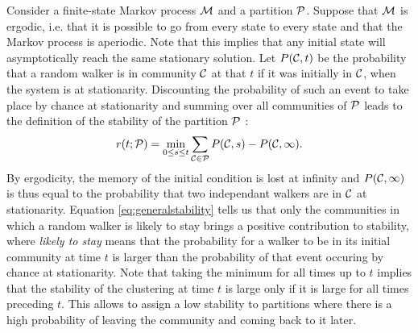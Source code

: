 Consider a finite-state Markov process $\M$ and a partition $\P$. Suppose that $\M$ is ergodic, i.e. that it is possible to go from every state to every state and that the Markov process is aperiodic. Note that this implies that any initial state will asymptotically reach the same stationary solution. Let $P(\C,t)$ be the probability that a random walker is in community $\C$ at that $t$ if it was initially in $\C$, when the system is at stationarity. Discounting the probability of such an event to take place by chance at stationarity and summing over all communities of $\P$ leads to the definition of the stability of the partition $\P$ :
\begin{equation} \label{eq:generalstability}
	r(t;\P) = \min_{0 \le s \le t} \sum_{\C \in \P} P(\C,s) - P(\C,\infty).
\end{equation}
By ergodicity, the memory of the initial condition is lost at infinity and $P(\C,\infty)$ is thus equal to the probability that two independant walkers are in $\C$ at stationarity. Equation \eqref{eq:generalstability} tells us that only the communities in which a random walker is likely to stay brings a positive contribution to stability, where \textit{likely to stay} means that the probability for a walker to be in its initial community at time $t$ is larger than the probability of that event occuring by chance at stationarity. Note that taking the minimum for all times up to $t$ implies that the stability of the clustering at time $t$ is large only if it is large for all times preceding $t$. This allows to assign a low stability to partitions where there is a high probability of leaving the community and coming back to it later. 


